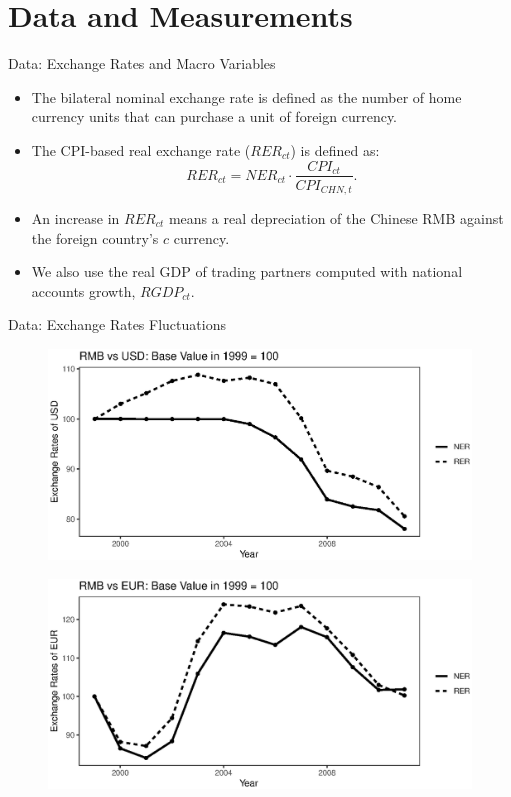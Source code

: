 \documentclass[10pt]{beamer}
\begin{document}
\section{Data and Measurements}

\begin{frame}{Data: Exchange Rates and Macro Variables}
	\begin{itemize}
		\item The bilateral nominal exchange rate is defined as the number of home currency units that can purchase a unit of foreign currency.
		\item The CPI-based real exchange rate ($RER_{ct}$) is defined as:
		$$
		RER_{ct}=NER_{ct} \cdot \frac{CPI_{ct}}{CPI_{CHN,t}}.
		$$
		\item An increase in $RER_{ct}$ means a real depreciation of the Chinese RMB against the
		foreign country’s $c$ currency.
		\item We also use the real GDP of trading partners computed with national accounts growth, $RGDP_{ct}$.
	\end{itemize}
\end{frame}

\begin{frame}{Data: Exchange Rates Fluctuations}
    \begin{figure}[htbp]
	\centering
	\includegraphics[width=0.65\columnwidth]{R/USD.eps}
        \label{fig.USD}
    \end{figure}
    \begin{figure}[htbp]
	\centering
	\includegraphics[width=0.65\columnwidth]{R/EUR.eps}
	\label{fig.EUR}
    \end{figure}
\end{frame}
\end{document}
